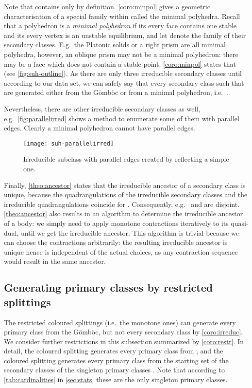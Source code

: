 \documentclass[]{article}
\newcommand{\col}{\xspace}
\newcommand{\Gomboc}{Gömböc\xspace}
\begin{document}
Note that  contains only  by definition.
\autoref{coro:minpol} gives a geometric characterisation of a special family within  called the minimal polyhedra.
Recall that a polyhedron is a \emph{minimal polyhedron} if its every face contains one stable and its every vertex is an unstable equilibrium, and let  denote the family of their secondary classes.
E.g.\  the Platonic solids or a right prism are all minimal polyhedra, however, an oblique prism may not be a minimal polyhedron: there may be a face which does
not contain a stable point.
\autoref{coro:minpol} states that   (see \autoref{fig:suh-outline}).
As there are only three irreducible secondary classes until  according to our data set, we can safely say that every secondary class such that  are generated either from the \Gomboc or from a minimal polyhedron, i.e.\  .

Nevertheless, there are other irreducible secondary classes as well, e.g.\  \autoref{fig:parallelirred} shows a method to enumerate some of them with parallel edges.
Clearly a minimal polyhedron cannot have parallel edges.

\begin{figure}
\centering
\texttt{[image: suh-parallelirred]}
\caption{Irreducible subclass with parallel edges created by reflecting a simple one.}
\label{fig:parallelirred}
\end{figure}

Finally, \autoref{theo:ancestor} states that the irreducible ancestor of a secondary class is unique, because the quadrangulations of the irreducible secondary classes and the irreducible quadrangulations coincide for .
Consequently, e.g.\  \col and  are disjoint.
\autoref{theo:ancestor} also results in an algorithm to determine the irreducible ancestor of a body:
we simply need to apply monotone contractions iteratively to its quasi-dual, until we get the irreducible ancestor.
This algorithm is trivial because we can choose the contractions arbitrarily: the resulting irreducible ancestor is unique hence is independent of the actual choices, as any contraction sequence would result in the same ancestor.


\subsection{Generating primary classes by restricted splittings}

The restricted coloured splittings  (i.e.\  the monotone ones) can generate every primary class from the \Gomboc \cite{Domokos2006}, but not every secondary class by \autoref{coro:irreduc}.
We consider further restrictions in this subsection summarized by \autoref{coro:restr}.
In detail, the coloured splitting  generates every primary class from , and the coloured splitting  generates every primary class from the starting set of the secondary classes of the singleton primary classes .
Note that according to \autoref{tab:cardinalities} in \autoref{sec:stats} these are the only singleton primary classes.
\end{document}
